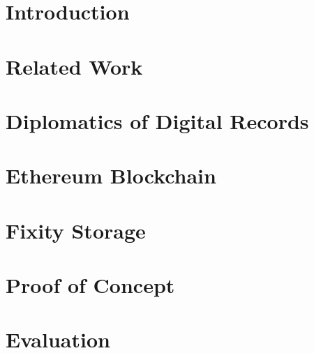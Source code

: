 \documentclass[final]{vutinfth} %
\begin{document}
\frontmatter %

\addstatementpage

\begin{kurzfassung}

\end{kurzfassung}

\begin{abstract}

\end{abstract}


\tableofcontents %

\mainmatter

\chapter{Introduction}

\chapter{Related Work}

\chapter{Diplomatics of Digital Records}
\label{ch:diplomatics}


\chapter{Ethereum Blockchain}
\label{ch:ethereum}

\chapter{Fixity Storage}
\label{ch:fixity-storage}

\chapter{Proof of Concept}
\label{ch:poc}

\chapter{Evaluation}
\label{ch:evaluation}

\end{document}
